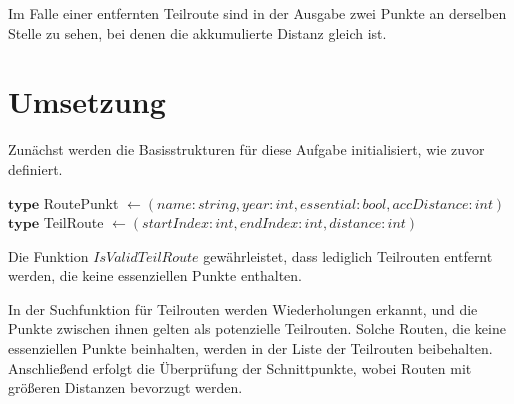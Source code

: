 \documentclass[a4paper,10pt,ngerman]{scrartcl}
\begin{document}
Im Falle einer entfernten Teilroute sind in der Ausgabe zwei Punkte an derselben Stelle zu sehen, bei denen die akkumulierte Distanz gleich ist.

\newpage
\section{Umsetzung}

Zunächst werden die Basisstrukturen für diese Aufgabe initialisiert, wie zuvor definiert.

\begin{algorithm}
\begin{algorithmic}
\State $\textbf{type}$ RoutePunkt $\gets (name: string, year: int, essential: bool, accDistance: int)$
\State $\textbf{type}$ TeilRoute $\gets (startIndex: int, endIndex: int, distance: int)$
\end{algorithmic}
\end{algorithm}

Die Funktion $IsValidTeilRoute$ gewährleistet, dass lediglich Teilrouten entfernt werden, die keine essenziellen Punkte enthalten.

\begin{algorithm}
    \begin{algorithmic}
        \State \Return \FALSE
        \EndIf
        \EndFor
        \State \Return \TRUE
        \EndFunction
    \end{algorithmic}
\end{algorithm}

In der Suchfunktion für Teilrouten werden Wiederholungen erkannt, und die Punkte zwischen ihnen gelten als potenzielle Teilrouten. Solche Routen, die keine essenziellen Punkte beinhalten, werden in der Liste der Teilrouten beibehalten. Anschließend erfolgt die Überprüfung der Schnittpunkte, wobei Routen mit größeren Distanzen bevorzugt werden.
\end{document}
